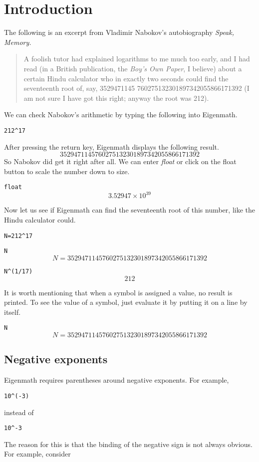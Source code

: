 \section{Introduction}
The following is an excerpt from Vladimir Nabokov's
autobiography {\it Speak, Memory.}
\begin{quote}
A foolish tutor had explained logarithms to me much too early, and I had
read (in a British publication, the {\it Boy's Own Paper}, I believe)
about a certain Hindu calculator who in exactly two seconds could find the
seventeenth root of, say,
3529471145 760275132301897342055866171392
(I am not sure I have got this right; anyway the root was 212).
\end{quote}
We can check Nabokov's arithmetic by typing the following into Eigenmath.

\medskip
\verb$212^17$

\medskip
\noindent
After pressing the return key, Eigenmath displays the following result.
$$3529471145760275132301897342055866171392$$
So Nabokov did get it right after all.
We can enter {\it float} or click on the float button to scale the number
down to size.

\medskip
\verb$float$
$$3.52947\times10^{39}$$

\medskip
\noindent
Now let us see if Eigenmath can find the
seventeenth root of this number, like the Hindu calculator could.

\medskip
\verb$N=212^17$

\verb$N$
$$N=3529471145760275132301897342055866171392$$

\verb$N^(1/17)$
$$212$$

\medskip
\noindent
It is worth mentioning that when a symbol is assigned a value,
no result is printed.
To see the value of a symbol, just evaluate it by putting it on a line by
itself.

\medskip
\verb$N$
$$N=3529471145760275132301897342055866171392$$

\newpage

\subsection{Negative exponents}
Eigenmath requires parentheses around negative exponents.
For example,

\medskip
\verb$10^(-3)$

\medskip
\noindent
instead of

\medskip
\verb$10^-3$

\medskip
\noindent
The reason for this is that the binding of the negative sign is not always
obvious.
For example, consider

